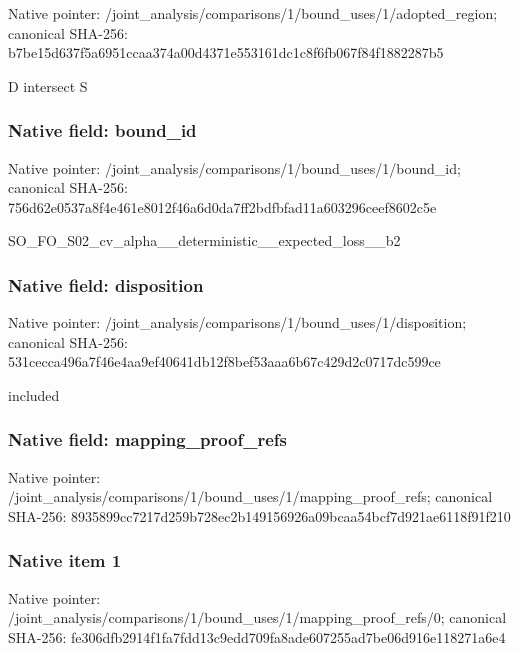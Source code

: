 \documentclass[10pt,a4paper]{article}
\begin{document}
Native pointer: /joint\_analysis/comparis\allowbreak{}ons/1/bound\_uses/1/adopt\allowbreak{}ed\_region; canonical SHA-256: b7be15d637f5a6951ccaa374\allowbreak{}a00d4371e553161dc1c8f6fb\allowbreak{}067f84f1882287b5


D intersect S


\subsubsection{Native field: bound\_id}


Native pointer: /joint\_analysis/comparis\allowbreak{}ons/1/bound\_uses/1/bound\allowbreak{}\_id; canonical SHA-256: 756d62e0537a8f4e461e8012\allowbreak{}f46a6d0da7ff2bdfbfad11a6\allowbreak{}03296ceef8602c5e


SO\_FO\_S02\_cv\_alpha\_\_dete\allowbreak{}rministic\_\_expected\_loss\allowbreak{}\_\_b2


\subsubsection{Native field: disposition}


Native pointer: /joint\_analysis/comparis\allowbreak{}ons/1/bound\_uses/1/dispo\allowbreak{}sition; canonical SHA-256: 531cecca496a7f46e4aa9ef4\allowbreak{}0641db12f8bef53aaa6b67c4\allowbreak{}29d2c0717dc599ce


included


\subsubsection{Native field: mapping\_proof\_refs}


Native pointer: /joint\_analysis/comparis\allowbreak{}ons/1/bound\_uses/1/mappi\allowbreak{}ng\_proof\_refs; canonical SHA-256: 8935899cc7217d259b728ec2\allowbreak{}b149156926a09bcaa54bcf7d\allowbreak{}921ae6118f91f210



\subsubsection{Native item 1}


Native pointer: /joint\_analysis/comparis\allowbreak{}ons/1/bound\_uses/1/mappi\allowbreak{}ng\_proof\_refs/0; canonical SHA-256: fe306dfb2914f1fa7fdd13c9\allowbreak{}edd709fa8ade607255ad7be0\allowbreak{}6d916e118271a6e4
\end{document}
